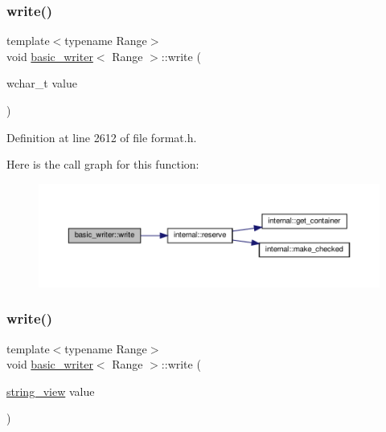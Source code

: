 \subsubsection{\texorpdfstring{write()}{write()}\hspace{0.1cm}{\footnotesize\ttfamily [11/16]}}
{\footnotesize\ttfamily template$<$typename Range$>$ \\
void \hyperlink{classbasic__writer}{basic\+\_\+writer}$<$ Range $>$\+::write (\begin{DoxyParamCaption}\item[{wchar\+\_\+t}]{value }\end{DoxyParamCaption})\hspace{0.3cm}{\ttfamily [inline]}}



Definition at line 2612 of file format.\+h.

Here is the call graph for this function\+:
\nopagebreak
\begin{figure}[H]
\begin{center}
\leavevmode
\includegraphics[width=350pt]{classbasic__writer_a343bc30c71b3fcd298c0ddd78bf9e8ee_cgraph}
\end{center}
\end{figure}
\mbox{\label{classbasic__writer_a9145dbe901036b8f1a35587faac5e74e}} 
\subsubsection{\texorpdfstring{write()}{write()}\hspace{0.1cm}{\footnotesize\ttfamily [12/16]}}
{\footnotesize\ttfamily template$<$typename Range$>$ \\
void \hyperlink{classbasic__writer}{basic\+\_\+writer}$<$ Range $>$\+::write (\begin{DoxyParamCaption}\item[{\hyperlink{core_8h_a17e3ff7f9ac2b8f068f719b829890036}{string\+\_\+view}}]{value }\end{DoxyParamCaption})\hspace{0.3cm}{\ttfamily [inline]}}

